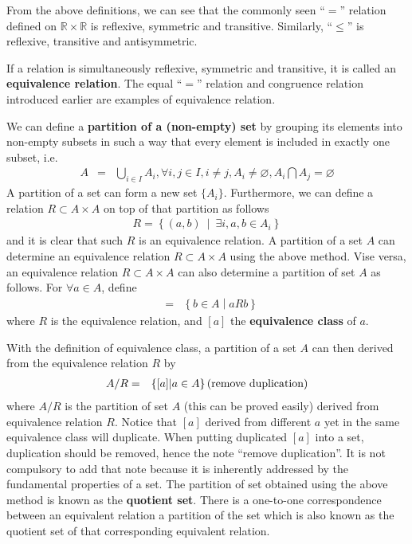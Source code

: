 From the above definitions, we can see that the commonly seen ``$=$'' relation defined on $\mathbb{R}\times\mathbb{R}$ is reflexive, symmetric and transitive. Similarly, ``$\leq$'' is reflexive, transitive and antisymmetric.

If a relation is simultaneously reflexive, symmetric and transitive, it is called an \textbf{equivalence relation}. The equal ``$=$'' relation and congruence relation introduced earlier are examples of equivalence relation.

We can define a \textbf{partition of a (non-empty) set} by grouping its elements into non-empty subsets in such a way that every element is included in exactly one subset, i.e.
\begin{eqnarray}
	A &=& \bigcup_{i\in I}A_i, \forall i, j \in I, i\neq j, A_i \neq \varnothing, A_i \bigcap A_j = \varnothing \nonumber
\end{eqnarray}
A partition of a set can form a new set $\{A_i\}$. Furthermore, we can define a relation $R\subset A \times A$ on top of that partition as follows
\begin{eqnarray}
	R = \left\{(a,b)~\middle|~\exists i, a,b \in A_i\right\} \nonumber
\end{eqnarray}
and it is clear that such $R$ is an equivalence relation. A partition of a set $A$ can determine an equivalence relation $R\subset A\times A$ using the above method. Vise versa, an equivalence relation $R\subset A\times A$ can also determine a partition of set $A$ as follows. For $\forall a \in A$, define
\begin{eqnarray}
	[a] &=& \left\{b \in A\middle| aRb \right\} \nonumber
\end{eqnarray}
where $R$ is the equivalence relation, and $[a]$ the \textbf{equivalence class} of $a$. 

With the definition of equivalence class, a partition of a set $A$ can then derived from the equivalence relation $R$ by
\begin{eqnarray}
	A/R &=& \left\{[a] | a \in A \right\} \textup{(remove duplication)} \label{eq:quotient_set}
\end{eqnarray}
where $A/R$ is the partition of set $A$ (this can be proved easily) derived from equivalence relation $R$. Notice that $[a]$ derived from different $a$ yet in the same equivalence class will duplicate. When putting duplicated $[a]$ into a set, duplication should be removed, hence the note ``remove duplication''. It is not compulsory to add that note because it is inherently addressed by the fundamental properties of a set. The partition of set obtained using the above method is known as the \textbf{quotient set}. There is a one-to-one correspondence between an equivalent relation a partition of the set which is also known as the quotient set of that corresponding equivalent relation.

